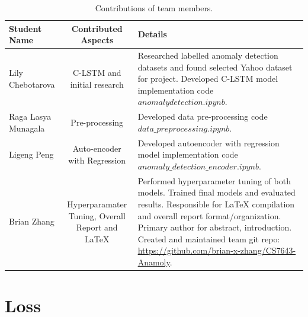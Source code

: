 \documentclass[10pt,twocolumn,letterpaper]{article}
\begin{document}
\begin{table}
\begin{tabular}{|l|c|p{6cm}|}
\hline
Student Name & Contributed Aspects & Details \\
\hline\hline
Lily Chebotarova            & C-LSTM and initial research  & Researched labelled anomaly detection datasets and found selected Yahoo dataset for project. Developed C-LSTM model implementation code \(anomalydetection.ipynb\). \\ \hline 
Raga Lasya Munagala         & Pre-processing & Developed data pre-processing code \(data\_preprocessing.ipynb\). \\ \hline
Ligeng Peng                 & Auto-encoder with Regression  & Developed autoencoder with regression model implementation code \(anomaly\_detection\_encoder.ipynb\). \\ \hline
Brian Zhang                 & Hyperparamater Tuning, Overall Report and LaTeX  & Performed hyperparameter tuning of both models. Trained final models and evaluated results. Responsible for LaTeX compilation and overall report format/organization. Primary author for abstract, introduction. Created and maintained team git repo: \url{https://github.com/brian-x-zhang/CS7643-Anamoly}. \\ \hline
\hline
\end{tabular}
\caption{Contributions of team members.}
\label{tab:contributions}
\end{table}




{\small


}

\section{Loss}
\end{document}
